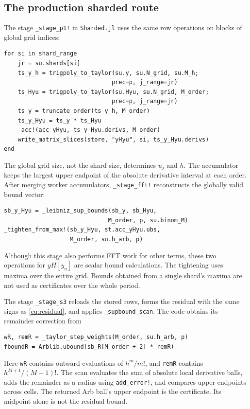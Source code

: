 \documentclass[11pt]{article}
\theoremstyle{definition}
\theoremstyle{remark}
\newcommand{\code}[1]{\nolinkurl{#1}}
\numberwithin{equation}{section}
\begin{document}
\subsection{The production sharded route}
The stage \code{_stage_p1!} in \code{Sharded.jl} uses the same row operations
on blocks of global grid indices:
\begin{lstlisting}
for si in shard_range
    jr = su.shards[si]
    ts_y_h = trigpoly_to_taylor(su.y, su.N_grid, su.M_h;
                               prec=p, j_range=jr)
    ts_Hyu = trigpoly_to_taylor(su.Hyu, su.N_grid, M_order;
                               prec=p, j_range=jr)
    ts_y = truncate_order(ts_y_h, M_order)
    ts_y_Hyu = ts_y * ts_Hyu
    _acc!(acc_yHyu, ts_y_Hyu.derivs, M_order)
    write_matrix_slices(store, "yHyu", si, ts_y_Hyu.derivs)
end
\end{lstlisting}
The global grid size, not the shard size, determines $u_j$ and $h$.
The accumulator keeps the largest upper endpoint of the absolute
derivative interval at each order. After merging worker accumulators,
\code{_stage_fft!} reconstructs the globally valid bound vector:
\begin{lstlisting}
sb_y_Hyu = _leibniz_sup_bounds(sb_y, sb_Hyu,
                              M_order, p, su.binom_M)
_tighten_from_max!(sb_y_Hyu, st.acc_yHyu.ubs,
                   M_order, su.h_arb, p)
\end{lstlisting}
Although this stage also performs FFT work for other terms, these two
operations for $yH[y_u]$ are scalar bound calculations. The tightening
uses maxima over the entire grid. Bounds obtained from a single shard's
maxima are not used as certificates over the whole period.

The stage \code{_stage_s3} reloads the stored rows, forms the residual with
the same signs as \eqref{eq:residual}, and applies \code{_supbound_scan}.
The code obtains its remainder correction from
\begin{lstlisting}
wR, remR = _taylor_step_weights(M_order, su.h_arb, p)
fboundR = Arblib.ubound(sb_R[M_order + 2] * remR)
\end{lstlisting}
Here \code{wR} contains outward evaluations of $h^m/m!$, and \code{remR}
contains $h^{M+1}/(M+1)!$. The scan evaluates the sum of absolute local
derivative balls, adds the remainder as a radius using \code{add_error!},
and compares upper endpoints across cells. The returned Arb ball's upper
endpoint is the certificate. Its midpoint alone is not the residual bound.
\end{document}
